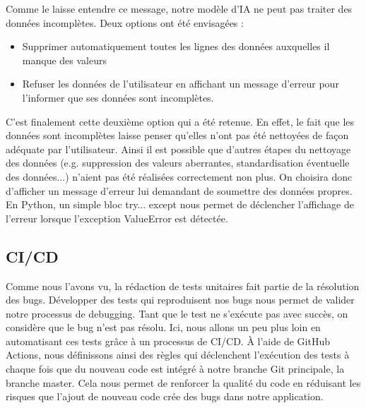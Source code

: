 \documentclass[french]{article}
\begin{document}
    Comme le laisse entendre ce message, notre modèle d'IA ne peut pas traiter des données incomplètes. Deux options ont été envisagées :
    \begin{itemize}
        \item Supprimer automatiquement toutes les lignes des données auxquelles il manque des valeurs
        \item Refuser les données de l'utilisateur en affichant un message d'erreur pour l'informer que ses données sont incomplètes.
    \end{itemize}
    C'est finalement cette deuxième option qui a été retenue. En effet, le fait que les données sont incomplètes laisse penser qu'elles n'ont pas été nettoyées de façon adéquate par l'utilisateur. Ainsi il est possible que d'autres étapes du nettoyage des données (e.g. suppression des valeurs aberrantes, standardisation éventuelle des données...) n'aient pas été réalisées correctement non plus. On choisira donc d'afficher un message d'erreur lui demandant de soumettre des données propres. En Python, un simple bloc try... except nous permet de déclencher l'affichage de l'erreur lorsque l'exception ValueError est détectée.
    \subsection{CI/CD}
    Comme nous l'avons vu, la rédaction de tests unitaires fait partie de la résolution des bugs. Développer des tests qui reproduisent nos bugs nous permet de valider notre processus de debugging. Tant que le test ne s'exécute pas avec succès, on considère que le bug n'est pas résolu. Ici, nous allons un peu plus loin en automatisant ces tests grâce à un processus de CI/CD. À l'aide de GitHub Actions, nous définissons ainsi des règles qui déclenchent l'exécution des tests à chaque fois que du nouveau code est intégré à notre branche Git principale, la branche master. Cela nous permet de renforcer la qualité du code en réduisant les risques que l'ajout de nouveau code crée des bugs dans notre application.
\end{document}
